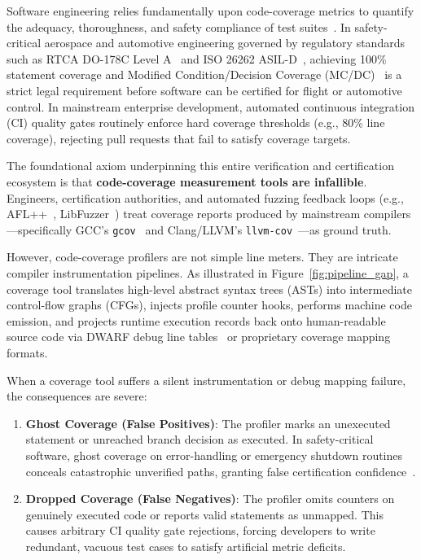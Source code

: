 \documentclass[sigconf,review,anonymous=false]{acmart}
\theoremstyle{definition}
\begin{document}
Software engineering relies fundamentally upon code-coverage metrics to quantify the adequacy, thoroughness, and safety compliance of test suites~\cite{zhu1997software,ince1987importance}. In safety-critical aerospace and automotive engineering governed by regulatory standards such as RTCA DO-178C Level A~\cite{rtca2011do178c} and ISO 26262 ASIL-D~\cite{iso2018iso26262}, achieving 100\% statement coverage and Modified Condition/Decision Coverage (MC/DC)~\cite{chilenski1994applicability,cast6} is a strict legal requirement before software can be certified for flight or automotive control. In mainstream enterprise development, automated continuous integration (CI) quality gates routinely enforce hard coverage thresholds (e.g., 80\% line coverage), rejecting pull requests that fail to satisfy coverage targets.

The foundational axiom underpinning this entire verification and certification ecosystem is that \textbf{code-coverage measurement tools are infallible}. Engineers, certification authorities, and automated fuzzing feedback loops (e.g., AFL++~\cite{fioraldi2020afl++}, LibFuzzer~\cite{serebryany2016continuous}) treat coverage reports produced by mainstream compilers—specifically GCC's \texttt{gcov}~\cite{stallman2002gnu} and Clang/LLVM's \texttt{llvm-cov}~\cite{lattner2004llvm}—as ground truth.

However, code-coverage profilers are not simple line meters. They are intricate compiler instrumentation pipelines. As illustrated in Figure~\ref{fig:pipeline_gap}, a coverage tool translates high-level abstract syntax trees (ASTs) into intermediate control-flow graphs (CFGs), injects profile counter hooks, performs machine code emission, and projects runtime execution records back onto human-readable source code via DWARF debug line tables~\cite{dwarf2017} or proprietary coverage mapping formats. 

When a coverage tool suffers a silent instrumentation or debug mapping failure, the consequences are severe:
\begin{enumerate}
    \item \textbf{Ghost Coverage (False Positives)}: The profiler marks an unexecuted statement or unreached branch decision as executed. In safety-critical software, ghost coverage on error-handling or emergency shutdown routines conceals catastrophic unverified paths, granting false certification confidence~\cite{dupuy2000empirical}.
    \item \textbf{Dropped Coverage (False Negatives)}: The profiler omits counters on genuinely executed code or reports valid statements as unmapped. This causes arbitrary CI quality gate rejections, forcing developers to write redundant, vacuous test cases to satisfy artificial metric deficits.
\end{enumerate}
\end{document}
